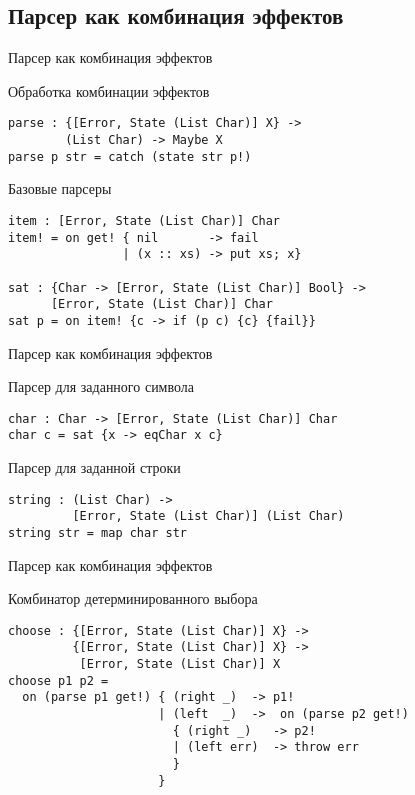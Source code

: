 \subsection{Парсер как комбинация эффектов}

\begin{frame}[fragile]{Парсер как комбинация эффектов}

\begin{block}{Обработка комбинации эффектов}
\begin{verbatim}
parse : {[Error, State (List Char)] X} ->
        (List Char) -> Maybe X
parse p str = catch (state str p!)
\end{verbatim}
\end{block}

\pause

\begin{block}{Базовые парсеры}
\begin{verbatim}
item : [Error, State (List Char)] Char
item! = on get! { nil       -> fail
                | (x :: xs) -> put xs; x}

sat : {Char -> [Error, State (List Char)] Bool} ->
      [Error, State (List Char)] Char
sat p = on item! {c -> if (p c) {c} {fail}}
\end{verbatim}
\end{block}
\end{frame}

\begin{frame}[fragile]{Парсер как комбинация эффектов}
\begin{block}{Парсер для заданного символа}
\begin{verbatim}
char : Char -> [Error, State (List Char)] Char
char c = sat {x -> eqChar x c}
\end{verbatim}
\end{block}

\begin{block}{Парсер для заданной строки}
\begin{verbatim}
string : (List Char) ->
         [Error, State (List Char)] (List Char)
string str = map char str
\end{verbatim}
\end{block}
\end{frame}

\begin{frame}[fragile]{Парсер как комбинация эффектов}
\begin{block}{Комбинатор детерминированного выбора}
\begin{verbatim}
choose : {[Error, State (List Char)] X} ->
         {[Error, State (List Char)] X} ->
          [Error, State (List Char)] X
choose p1 p2 =
  on (parse p1 get!) { (right _)  -> p1!
                     | (left  _)  ->  on (parse p2 get!)
                       { (right _)   -> p2!
                       | (left err)  -> throw err
                       }
                     }
\end{verbatim}
\end{block}
\end{frame}

